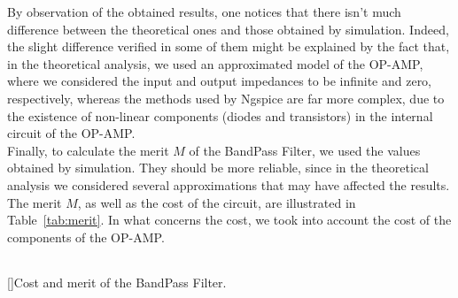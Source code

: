 \vspace{10mm}

By observation of the obtained results, one notices that there isn't much difference between the theoretical ones and those obtained by simulation. Indeed, the slight difference verified in some of them might be explained by the fact that, in the theoretical analysis, we used an approximated model of the OP-AMP, where we considered the input and output impedances to be infinite and zero, respectively, whereas the methods used by Ngspice are far more complex, due to the existence of non-linear components (diodes and transistors) in the internal circuit of the OP-AMP.\\

Finally, to calculate the merit $M$ of the BandPass Filter, we used the values obtained by simulation. They should be more reliable, since in the theoretical analysis we considered several approximations that may have affected the results. The merit $M$, as well as the cost of the circuit, are illustrated in Table~\ref{tab:merit}. In what concerns the cost, we took into account the cost of the components of the OP-AMP.

\vspace{2mm}

\begin{center}
\begin{tabular}{ | c | c | }\hline
 
\end{tabular}
[]{Cost and merit of the BandPass Filter.}
\label{tab:merit}
\end{center}

\vspace{3mm}
